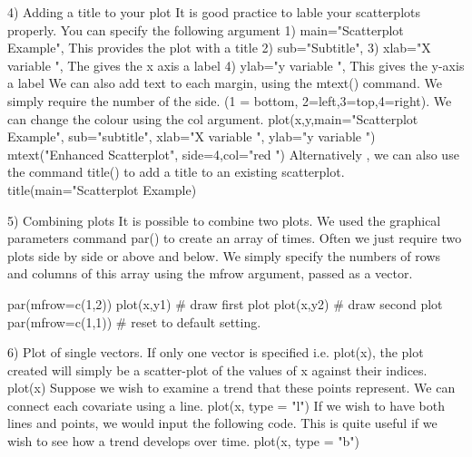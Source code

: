 4)	Adding a title to your plot
It is good practice to lable your scatterplots properly. You can specify the following argument
1)	main="Scatterplot Example", 		This provides the plot with a title
2)	sub="Subtitle",
3)	xlab="X variable ",				The gives the x axis a label
4)	ylab="y variable ",				This gives the y-axis a label
We can also add text to each margin, using the mtext() command.  We simply require the number of the side. (1 = bottom, 2=left,3=top,4=right). We can change the colour using the col argument.
plot(x,y,main="Scatterplot Example",   sub="subtitle",    xlab="X variable ", ylab="y variable ")	
mtext("Enhanced Scatterplot", side=4,col="red ")
Alternatively , we can also use the command title() to add a title to an existing scatterplot.
title(main="Scatterplot Example)	



5)	Combining plots
It is possible to combine two plots. We used the graphical parameters command par() to create an array of times. Often we just require two plots side by side or above and below. We simply specify the numbers of rows  and  columns of this array using the mfrow argument, passed as a vector.

par(mfrow=c(1,2))
plot(x,y1)			# draw first plot
plot(x,y2)			# draw second plot
par(mfrow=c(1,1))		# reset to default setting.
      
6)	Plot of single vectors.
If only one vector is specified i.e. plot(x),  the plot created will simply be a scatter-plot of the values of x against their indices.
plot(x)
Suppose we wish to examine a trend that these points represent. We can connect each covariate using a line.
plot(x, type = "l")
If we wish to have both lines and points, we would input the following code. This is quite useful if we wish to see how a trend develops over time.
plot(x, type = "b")

